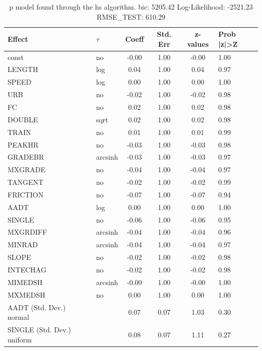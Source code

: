 \begin{table}
	\caption{p model found through the hs algorithm. bic: 5205.42 Log-Likelihood: -2521.23 RMSE_TEST: 610.29}
	\begin{center}
		\begin{tabular}{|l|l|c|c|c|l|}
			\hline
			Effect & $\tau$ & Coeff & Std. Err & z-values & Prob |z|>Z \\
			\hline
			const & no & -0.00 & 1.00 & -0.00 & 1.00 \\
			\hline
			LENGTH & log & 0.04 & 1.00 & 0.04 & 0.97 \\
			\hline
			SPEED & log & 0.00 & 1.00 & 0.00 & 1.00 \\
			\hline
			URB & no & -0.02 & 1.00 & -0.02 & 0.98 \\
			\hline
			FC & no & 0.02 & 1.00 & 0.02 & 0.98 \\
			\hline
			DOUBLE & sqrt & 0.02 & 1.00 & 0.02 & 0.98 \\
			\hline
			TRAIN & no & 0.01 & 1.00 & 0.01 & 0.99 \\
			\hline
			PEAKHR & no & -0.03 & 1.00 & -0.03 & 0.98 \\
			\hline
			GRADEBR & arcsinh & -0.03 & 1.00 & -0.03 & 0.97 \\
			\hline
			MXGRADE & no & -0.04 & 1.00 & -0.04 & 0.97 \\
			\hline
			TANGENT & no & -0.02 & 1.00 & -0.02 & 0.99 \\
			\hline
			FRICTION & no & -0.07 & 1.00 & -0.07 & 0.94 \\
			\hline
			AADT & log & 0.00 & 1.00 & 0.00 & 1.00 \\
			\hline
			SINGLE & no & -0.06 & 1.00 & -0.06 & 0.95 \\
			\hline
			MXGRDIFF & arcsinh & -0.04 & 1.00 & -0.04 & 0.96 \\
			\hline
			MINRAD & arcsinh & -0.04 & 1.00 & -0.04 & 0.97 \\
			\hline
			SLOPE & no & -0.02 & 1.00 & -0.02 & 0.98 \\
			\hline
			INTECHAG & no & -0.02 & 1.00 & -0.02 & 0.98 \\
			\hline
			MIMEDSH & arcsinh & -0.00 & 1.00 & -0.00 & 1.00 \\
			\hline
			MXMEDSH & no & 0.00 & 1.00 & 0.00 & 1.00 \\
			\hline
			AADT (Std. Dev.) normal &  & 0.07 & 0.07 & 1.03 & 0.30 \\
			\hline
			SINGLE (Std. Dev.) uniform &  & 0.08 & 0.07 & 1.11 & 0.27 \\
			\hline

\end{tabular}
\end{center}
\end{table}
